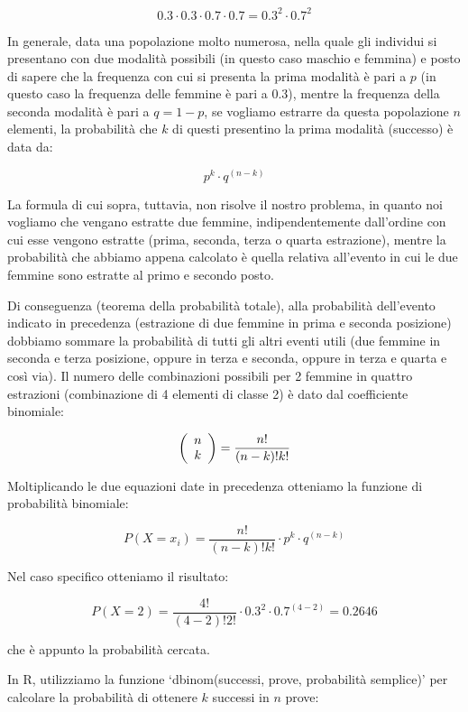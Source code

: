 \documentclass[a4paper,12pt,oneside]{book}
\begin{document}
\[0.3 \cdot 0.3 \cdot 0.7 \cdot 0.7 = 0.3^2 \cdot 0.7^2\]

In generale, data una popolazione molto numerosa, nella quale gli individui si presentano con due modalità possibili (in questo caso maschio e femmina) e posto di sapere che la frequenza con cui si presenta la prima modalità è pari a \(p\) (in questo caso la frequenza delle femmine è pari a 0.3), mentre la frequenza della seconda modalità è pari a \(q = 1 - p\), se vogliamo estrarre da questa popolazione \(n\) elementi, la probabilità che \(k\) di questi presentino la prima modalità (successo) è data da:

\[p^k \cdot q^{(n-k)}\]

La formula di cui sopra, tuttavia, non risolve il nostro problema, in quanto noi vogliamo che vengano estratte due femmine, indipendentemente dall'ordine con cui esse vengono estratte (prima, seconda, terza o quarta estrazione), mentre la probabilità che abbiamo appena calcolato è quella relativa all'evento in cui le due femmine sono estratte al primo e secondo posto.

Di conseguenza (teorema della probabilità totale), alla probabilità dell'evento indicato in precedenza (estrazione di due femmine in prima e seconda posizione) dobbiamo sommare la probabilità di tutti gli altri eventi utili (due femmine in seconda e terza posizione, oppure in terza e seconda, oppure in terza e quarta e così via). Il numero delle combinazioni possibili per 2 femmine in quattro estrazioni (combinazione di 4 elementi di classe 2) è dato dal coefficiente binomiale:

\[\left( {\begin{array}{*{20}c}
n  \\
k  \\
\end{array}} \right) = \frac{n!}{(n - k)!k!} \]

Moltiplicando le due equazioni date in precedenza otteniamo la funzione di probabilità binomiale:

\[P(X = x_i ) = \frac{{n!}}{{(n - k)!k!}} \cdot p^k \cdot q^{(n - k)} \]

Nel caso specifico otteniamo il risultato:

\[P(X = 2) = \frac{4!}{(4 - 2)!2!} \cdot 0.3^2 \cdot 0.7^{(4 - 2)}  = 0.2646 \]

che è appunto la probabilità cercata.

In R, utilizziamo la funzione `dbinom(successi, prove, probabilità semplice)' per calcolare la probabilità di ottenere \(k\) successi in \(n\) prove:
\end{document}
